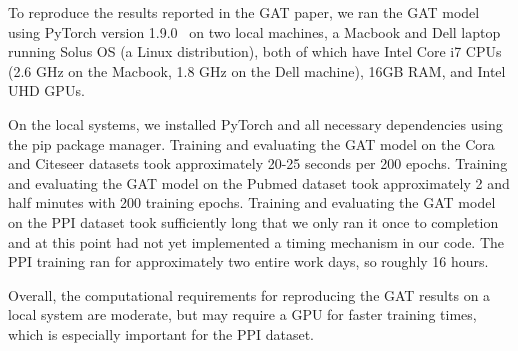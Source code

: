 To reproduce the results reported in the GAT paper, we ran the GAT model using
PyTorch version 1.9.0~\cite{paszke2019pytorch} on two local machines, a Macbook
and Dell laptop running Solus OS (a Linux distribution), both of which have
Intel Core i7 CPUs (2.6 GHz on the Macbook, 1.8 GHz on the Dell machine), 16GB
RAM, and Intel UHD GPUs.

On the local systems, we installed PyTorch and all necessary dependencies using
the pip package manager. Training and evaluating the GAT model on the Cora and
Citeseer datasets took approximately 20-25 seconds per 200 epochs. Training and
evaluating the GAT model on the Pubmed dataset took approximately 2 and half
minutes with 200 training epochs. Training and evaluating the GAT model on the
PPI dataset took sufficiently long that we only ran it once to completion and
at this point had not yet implemented a timing mechanism in our code. The PPI
training ran for approximately two entire work days, so roughly 16 hours.

Overall, the computational requirements for reproducing the GAT results on a
local system are moderate, but may require a GPU for faster training times,
which is especially important for the PPI dataset.
